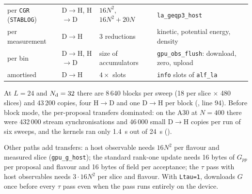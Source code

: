 \begin{small}
\begin{longtable}{@{}p{3.6cm}p{2.9cm}p{3.4cm}p{4.9cm}@{}}
per \texttt{CGR} (\texttt{STABLOG}) & D$\to$H, H$\to$D & $16N^2$, $16N^2+20N$ & \texttt{la\_geqp3\_host} \\
per measurement & D$\to$H & 3 reductions & kinetic, potential energy, density \\
per bin & D$\to$H, H$\to$D & size of accumulators & \texttt{gpu\_obs\_flush}: download, zero, upload \\
amortised & D$\to$H & $4\times$ slots & \texttt{info} slots of \texttt{alf\_la} \\
\bottomrule
\end{longtable}
\end{small}

At $L=24$ and $N_{\rm d}=32$ there are 8\,640 blocks per sweep (18 per slice $\times$ 480 slices) and 43\,200 copies, four H$\to$D and one D$\to$H per block (, line 94). %
Before block mode, the per-proposal transfers dominated: on the A30 at $N=400$ there were 432\,000 stream synchronisations and 46\,000 small D$\to$H copies per run of six sweeps, and the kernels ran only 1.4~s out of 24~s (). %

Other paths add transfers: a host observable needs $16N^2$ per flavour and measured slice (\texttt{gpu\_g\_host}); the standard rank-one update needs 16 bytes of $G_{pp}$ per proposal and flavour and 16 bytes of field per acceptance; the $\tau$ pass with host observables needs $3\cdot16N^2$ per slice and flavour. With \texttt{Ltau=1},  downloads $G$ once before every $\tau$ pass even when the pass runs entirely on the device.

